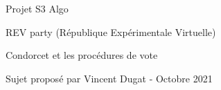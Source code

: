 Projet S3 Algo

REV party (République Expérimentale Virtuelle)

Condorcet et les procédures de vote

Sujet proposé par Vincent Dugat -\/ Octobre 2021 